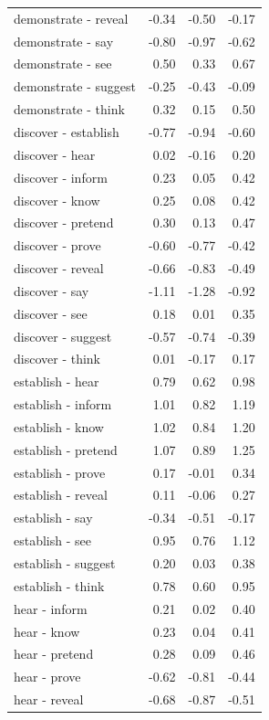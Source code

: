 \begin{longtable}{lrrr}
  demonstrate - reveal & -0.34 & -0.50 & -0.17 \\ 
  demonstrate - say & -0.80 & -0.97 & -0.62 \\ 
  demonstrate - see & 0.50 & 0.33 & 0.67 \\ 
  demonstrate - suggest & -0.25 & -0.43 & -0.09 \\ 
  demonstrate - think & 0.32 & 0.15 & 0.50 \\ 
  discover - establish & -0.77 & -0.94 & -0.60 \\ 
  discover - hear & 0.02 & -0.16 & 0.20 \\ 
  discover - inform & 0.23 & 0.05 & 0.42 \\ 
  discover - know & 0.25 & 0.08 & 0.42 \\ 
  discover - pretend & 0.30 & 0.13 & 0.47 \\ 
  discover - prove & -0.60 & -0.77 & -0.42 \\ 
  discover - reveal & -0.66 & -0.83 & -0.49 \\ 
  discover - say & -1.11 & -1.28 & -0.92 \\ 
  discover - see & 0.18 & 0.01 & 0.35 \\ 
  discover - suggest & -0.57 & -0.74 & -0.39 \\ 
  discover - think & 0.01 & -0.17 & 0.17 \\ 
  establish - hear & 0.79 & 0.62 & 0.98 \\ 
  establish - inform & 1.01 & 0.82 & 1.19 \\ 
  establish - know & 1.02 & 0.84 & 1.20 \\ 
  establish - pretend & 1.07 & 0.89 & 1.25 \\ 
  establish - prove & 0.17 & -0.01 & 0.34 \\ 
  establish - reveal & 0.11 & -0.06 & 0.27 \\ 
  establish - say & -0.34 & -0.51 & -0.17 \\ 
  establish - see & 0.95 & 0.76 & 1.12 \\ 
  establish - suggest & 0.20 & 0.03 & 0.38 \\ 
  establish - think & 0.78 & 0.60 & 0.95 \\ 
  hear - inform & 0.21 & 0.02 & 0.40 \\ 
  hear - know & 0.23 & 0.04 & 0.41 \\ 
  hear - pretend & 0.28 & 0.09 & 0.46 \\ 
  hear - prove & -0.62 & -0.81 & -0.44 \\ 
  hear - reveal & -0.68 & -0.87 & -0.51 \\ 

\end{longtable}
